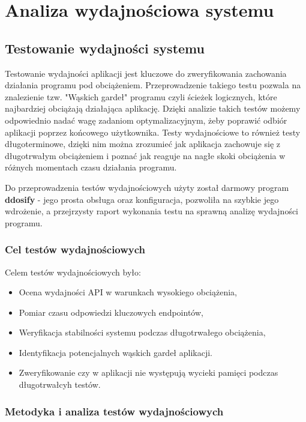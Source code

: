 \section{Analiza wydajnościowa systemu}
\subsection{Testowanie wydajności systemu}

Testowanie wydajności aplikacji jest kluczowe do zweryfikowania zachowania działania programu pod obciążeniem. Przeprowadzenie takiego testu pozwala na znalezienie tzw. "Wąskich gardeł" programu czyli ścieżek logicznych, które najbardziej obciążają działająca aplikację. Dzięki analizie takich testów możemy odpowiednio nadać wagę zadaniom optymalizacyjnym, żeby poprawić odbiór aplikacji poprzez końcowego użytkownika. Testy wydajnościowe to również testy długoterminowe, dzięki nim można zrozumieć jak aplikacja zachowuje się z długotrwałym obciążeniem i poznać jak reaguje na nagłe skoki obciążenia w różnych momentach czasu działania programu.

Do przeprowadzenia testów wydajnościowych użyty został darmowy program \textbf{ddosify} - jego prosta obsługa oraz konfiguracja, pozwoliła na szybkie jego wdrożenie, a przejrzysty raport wykonania testu na sprawną analizę wydajności programu. 

\subsubsection{Cel testów wydajnościowych}
Celem testów wydajnościowych było:
\begin{itemize}
    \item Ocena wydajności API w warunkach wysokiego obciążenia,
    \item Pomiar czasu odpowiedzi kluczowych endpointów,
    \item Weryfikacja stabilności systemu podczas długotrwałego obciążenia,
    \item Identyfikacja potencjalnych wąskich gardeł aplikacji.
    \item Zweryfikowanie czy w aplikacji nie występują wycieki pamięci podczas długotrwałcyh testów.
\end{itemize}

\subsubsection{Metodyka i analiza testów wydajnościowych}


